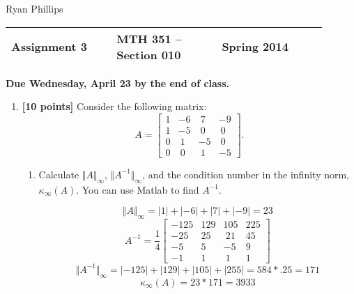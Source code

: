 \documentclass{article}
\newcommand{\myspace}{0.4cm}
\begin{document}
\large
Ryan Phillips

\begin{center}

\large
\begin{tabular}{L{0.3\linewidth} C{0.3\linewidth} R{0.3\linewidth}}
\hline
Assignment 3	&MTH 351 -- Section 010		&Spring 2014 \\
\hline
\end{tabular}

\vspace{\myspace}

{\bf Due Wednesday, April 23 by the end of class.}
\end{center}

\begin{enumerate}

\item {\bf [10 points]} Consider the following matrix:
\begin{equation*}
A=\begin{bmatrix}
    1    &-6     &~7   & -9\\
     1    &-5     &~0    &~0\\
     0     &~1    &-5     &~0\\
     0     &~0     &~1    &-5
\end{bmatrix}.
\end{equation*}
\begin{enumerate}
\item Calculate $\Vert A \Vert_{\infty}$,  $\Vert A^{-1} \Vert_{\infty}$, and the condition number in the infinity norm, $\displaystyle \kappa_{\infty} (A)$. You can use Matlab to find $A^{-1}$. \newline

\begin{mdframed}[style=MyFrame]

\begin{equation*}
\Vert A \Vert_{\infty} = |1| + |-6| + |7| + |-9| = 23
\end{equation*}
\begin{equation*}
A^{-1}= \frac{1}{4}\begin{bmatrix}
    -125    &129     &105   & 225\\
     -25    &25     &~21    &45\\
     -5     &5    &-5     &9\\
     -1     &1     &~1    &1
\end{bmatrix}
\end{equation*}
\begin{equation*}
\Vert A^{-1} \Vert_{\infty} = |-125| + |129| + |105| + |255| = 584*.25 = 171
\end{equation*}
\begin{equation*}
\displaystyle \kappa_{\infty} (A) = 23*171 = 3933
\end{equation*}


\end{mdframed}
\end{enumerate}
\end{enumerate}
\end{document}
